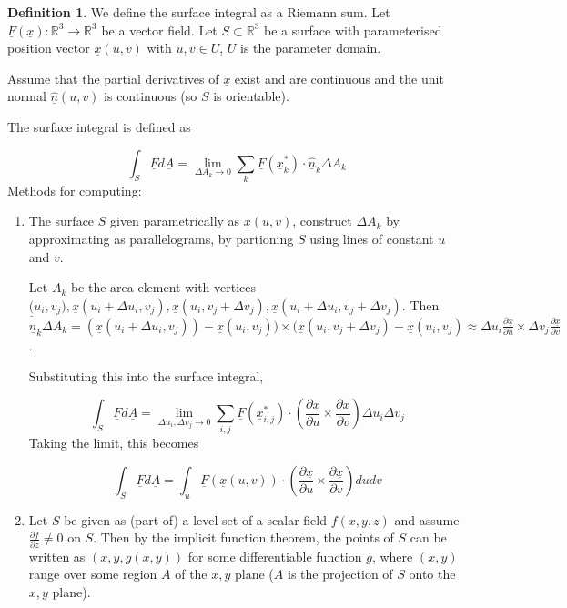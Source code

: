 \documentclass[12pt,a4paper]{article}
\theoremstyle{definition}
\newtheorem{definition}{Definition}[subsection]
\begin{document}
\begin{definition}
	We define the surface integral as a Riemann sum. Let $\underline{F}(\underline{x}): \mathbb{R}^3 \rightarrow \mathbb{R}^3$ be a vector field. Let $S \subset \mathbb{R}^3$ be a surface with parameterised position vector $\underline{x}(u, v)$ with $u, v \in U$, $U$ is the parameter domain.

	Assume that the partial derivatives of $\underline{x}$ exist and are continuous and the unit normal $\hat{\underline{n}}(u, v)$ is continuous (so $S$ is orientable).

	The surface integral is defined as

	\[ \int_S \underline{F} d\underline{A} = \lim_{\Delta A_k \rightarrow 0} \sum_k \underline{F} (\underline{x}_{k}^*) \cdot \underline{\hat{n}}_k \Delta A_k \]
	Methods for computing:

	\begin{enumerate}
		\item The surface $S$ given parametrically as $\underline{x}(u, v)$, construct $\Delta A_k$ by approximating as parallelograms, by partioning $S$ using lines of constant $u$ and $v$.
		
		Let $A_k$ be the area element with vertices $\underline(u_i, v_j), \underline{x}(u_i + \Delta u_i, v_j), \underline{x}(u_i, v_j + \Delta v_j), \underline{x}(u_i + \Delta u_i, v_j + \Delta v_j)$. Then $\underline{\hat{n}}_k \Delta A_k = (\underline{x}(u_i + \Delta u_i, v_j)) - \underline{x}(u_i, v_j)) \times (\underline{x}(u_i, v_j + \Delta v_j) - \underline{x}(u_i, v_j) \approx \Delta u_i \frac{\partial \underline{x}}{\partial u} \times \Delta v_j \frac{\partial \underline{x}}{\partial v}$.

		Substituting this into the surface integral,

		\[ \int_S \underline{F} d\underline{A} = \lim_{\Delta u_i, \Delta v_j \rightarrow 0} \sum_{i, j} \underline{F}(\underline{x}_{i, j}^*) \cdot \left( \frac{\partial \underline{x}}{\partial u} \times \frac{\partial \underline{x}}{\partial v} \right) \Delta u_i \Delta v_j \]
		Taking the limit, this becomes

		\[ \int_S \underline{F} d\underline{A} = \int_u \underline{F}(\underline{x}(u, v)) \cdot \left( \frac{\partial \underline{x}}{\partial u} \times \frac{\partial \underline{x}}{\partial v} \right) du dv \]

		\item Let $S$ be given as (part of) a level set of a scalar field $f(x, y, z)$ and assume $\frac{\partial f}{\partial z} \ne 0$ on $S$. Then by the implicit function theorem, the points of $S$ can be written as $(x, y, g(x, y))$ for some differentiable function $g$, where $(x, y)$ range over some region $A$ of the $x, y$ plane ($A$ is the projection of $S$ onto the $x, y$ plane).
		

\end{enumerate}
\end{definition}
\end{document}
